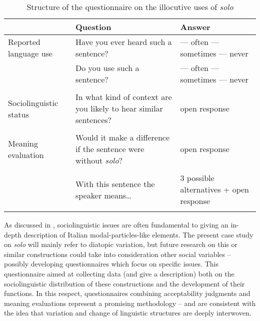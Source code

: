 \begin{table}
\begin{tabularx}{\textwidth}{lXX}
\lsptoprule
 & Question & Answer\\
 \midrule
Reported language use & Have you ever heard such a sentence? & {}--- often
\newline {}--- sometimes
\newline {}--- never\\
& Do you use such a sentence? & {}--- often
\newline {}--- sometimes
\newline {}--- never\\
\tablevspace\\
Sociolinguistic
status & In what kind of context are you likely to hear similar sentences? & open response\\
\tablevspace\\
Meaning evaluation & Would it make a difference if the sentence were without \textit{solo}? & open response\\
\tablevspace\\
& With this sentence the speaker means… & 3 possible alternatives
+ open response\\
\lspbottomrule
\end{tabularx}
\caption{\label{tab:key:8.1} Structure of the questionnaire on the illocutive uses of \textit{solo}}
\end{table}

As discussed in , sociolinguistic issues are often fundamental to giving an in-depth description of Italian modal-particles-like elements. The present case study on \textit{solo} will mainly refer to diatopic variation, but future research on this or similar constructions could take into consideration other social variables – possibly developing questionnaires which focus on specific issues. This questionnaire aimed at collecting data (and give a description) both on the sociolinguistic distribution of these constructions and the development of their functions. In this respect, questionnaires combining acceptability judgments and meaning evaluations represent a promising methodology – and are consistent with the idea that variation and change of linguistic structures are deeply interwoven.

\newpage
